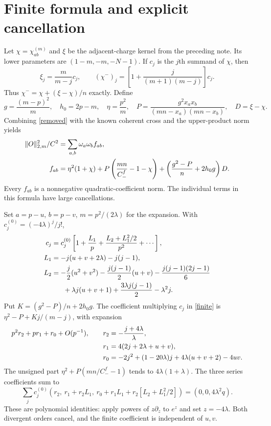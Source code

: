 \documentclass[11pt,a4paper]{article}
\begin{document}
\newpage
\section{Finite formula and explicit cancellation}
Let $\chi=\chi^{(m)}_{ab}$ and $\xi$ be the adjacent-charge kernel
from the preceding note. Its lower parameters are $(1-m,-m,-N-1)$.
If $c_j$ is the $j$th summand of $\chi$, then
\begin{equation}
 \xi_j=\frac m{m-j}c_j,\qquad
 (\chi^-)_j=\left[1+\frac{j}{(m+1)(m-j)}\right]c_j.
\end{equation}
Thus $\chi^-=\chi+(\xi-\chi)/n$ exactly. Define
\begin{equation}
 g=\frac{(m-p)^2}{m},\quad h_0=2p-m,\quad \eta=\frac{p^2}{m},
 \quad P=\frac{g^2x_ax_b}{(mn-x_a)(mn-x_b)},\quad D=\xi-\chi.
\end{equation}
Combining \eqref{removed} with the known coherent cross and the
upper-product norm yields
\begin{align}
 \|O\|_{2,m}^2/C^2&=\sum_{a,b}\omega_a\omega_b f_{ab},\notag\\
 f_{ab}&=\eta^2(1+\chi)+P\left(\frac{mn}{C_-^f}-1-\chi\right)
       +\left(\frac{g^2-P}{n}+2h_0g\right)D.\label{finite}
\end{align}
Every $f_{ab}$ is a nonnegative quadratic-coefficient norm.
The individual terms in this formula have large cancellations.

Set $a=p-u$, $b=p-v$, $m=p^2/(2\lambda)$ for the expansion.
With $c_j^{(0)}=(-4\lambda)^j/j!$,
\begin{align}
 c_j&=c_j^{(0)}\left[1+\frac{L_1}{p}
                  +\frac{L_2+L_1^2/2}{p^2}+\cdots\right],\notag\\
 L_1&=-j(u+v+2\lambda)-j(j-1),\notag\\
 L_2&=-\frac j2(u^2+v^2)-\frac{j(j-1)}2(u+v)
       -\frac{j(j-1)(2j-1)}6\notag\\
 &\hspace{6mm}+\lambda j(u+v+1)+\frac{3\lambda j(j-1)}2-\lambda^2j.
\end{align}
Put $K=(g^2-P)/n+2h_0g$. The coefficient multiplying $c_j$
in \eqref{finite} is $\eta^2-P+Kj/(m-j)$, with expansion
\begin{align}
 p^2r_2+pr_1+r_0+O(p^{-1}),\qquad
 r_2&=-\frac{j+4\lambda}{\lambda},\notag\\
 r_1&=4(2j+2\lambda+u+v),\notag\\
 r_0&=-2j^2+(1-20\lambda)j+4\lambda(u+v+2)-4uv.
\end{align}
The unsigned part $\eta^2+P(mn/C_-^f-1)$ tends to
$4\lambda(1+\lambda)$. The three series coefficients sum to
\begin{equation}
 \sum_j c_j^{(0)}(r_2,\ r_1+r_2L_1,\
 r_0+r_1L_1+r_2[L_2+L_1^2/2])=(0,0,4\lambda^2q).
 \label{cancellation}
\end{equation}
These are polynomial identities: apply powers of $z\partial_z$
to $e^z$ and set $z=-4\lambda$. Both divergent orders cancel,
and the finite coefficient is independent of $u,v$.
\end{document}
